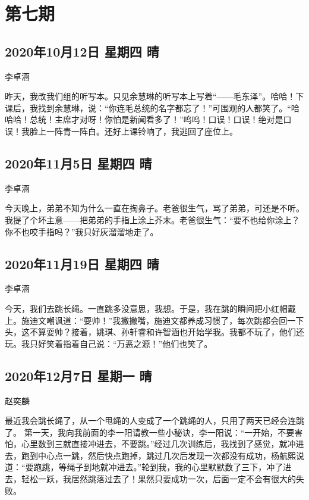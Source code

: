 \chapter{第七期}

\section{2020年10月12日 星期四 晴}

李卓涵

昨天，我改我们组的听写本。只见余慧琳的听写本上写着``------毛东泽''。哈哈！下课后，我找到余慧琳，说：``你连毛总统的名字都忘了！''可围观的人都笑了。``哈哈哈！总统！主席才对呀！你怕是新闻看多了！''呜呜！口误！口误！绝对是口误！我脸上一阵青一阵白。还好上课铃响了，我逃回了座位上。

\section{2020年11月5日 星期四 晴}

李卓涵

今天晚上，弟弟不知为什么一直在掏鼻子。老爸很生气，骂了弟弟，可还是不听。我提了个坏主意------把弟弟的手指上涂上芥末。老爸很生气：``要不也给你涂上？你不也咬手指吗？''我只好灰溜溜地走了。

\section{2020年11月19日 星期四 晴}

李卓涵

今天，我们去跳长绳。一直跳多没意思，我想。于是，我在跳的瞬间把小红帽戴上。施迪文嘲讽道：``耍帅！''我撇撇嘴，施迪文都养成习惯了，每次跳都会回一下头，这不算耍帅？接着，姚琪、孙轩睿和许智涵也开始学我。我都不玩了，他们还玩。我只好笑着指着自己说：``万恶之源！''他们也笑了。

\section{2020年12月7日 星期一 晴}

赵奕麟

最近我会跳长绳了，从一个甩绳的人变成了一个跳绳的人，只用了两天已经会连跳了。
第一天，我向我前面的李一阳请教一些小秘诀，李一阳说：``一开始，不要害怕，心里数到三就直接冲进去，不要跳。''经过几次训练后，我找到了感觉，就冲进去，跑到中心点一跳，然后快点跑掉，跳过几次后发现一次都没有成功，杨航熙说道：``要跑跳，等绳子到地就冲进去。''轮到我，我的心里默默数了三下，冲了进去，轻松一跃，我居然跳落过去了！果然只要成功一次，后面一定不会有很大的失败。

